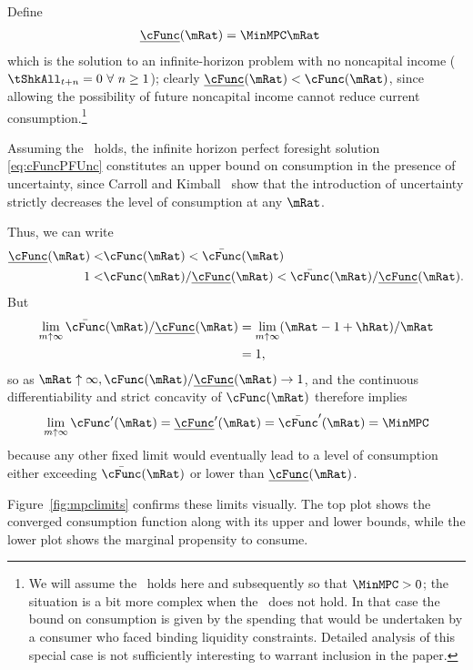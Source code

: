 \documentclass[BufferStockTheory]{subfiles}
\begin{document}
Define
\begin{align}
  \ushort{\cFunc}(\mRat)  & = \MinMPC \mRat \nonumber
\end{align}
which is the solution to an infinite-horizon problem with no noncapital
income
($\tShkAll_{t+n} = 0~\forall~n\geq1$); 
clearly $\ushort{\cFunc}(\mRat)
< \cFunc(\mRat)$, since allowing the possibility of future noncapital
income cannot reduce current consumption.\footnote{We will assume the
  \RIC~holds here and subsequently so that $\MinMPC > 0$; the situation
  is a bit more complex when the \RIC~does not hold.   In that case the bound on consumption is given by the spending
  that would be undertaken by a consumer who faced binding liquidity
  constraints.  Detailed analysis of this special case is not
  sufficiently interesting to warrant inclusion in the paper.}

Assuming the \FHWC~holds, the infinite horizon perfect
foresight solution \eqref{eq:cFuncPFUnc} constitutes an upper
bound on consumption in the presence of uncertainty, since Carroll and
Kimball~\citeyearpar{ckConcavity} show that the introduction of
uncertainty strictly decreases the level of consumption at any $\mRat$.

Thus, we can write
\begin{align}  
  \ushort{\cFunc}(\mRat) < & \cFunc(\mRat)  < \bar{\cFunc}(\mRat) \label{eq:lowerltupper} \\
  1 < & \cFunc(\mRat)/\ushort{\cFunc}(\mRat)  < \bar{\cFunc}(\mRat)/\ushort{\cFunc}(\mRat). \nonumber
\end{align}
But
\begin{align}  \label{eq:limitlowerupper}
  \lim_{m \uparrow \infty} \bar{\cFunc}(\mRat)/\ushort{\cFunc}(\mRat) 
  & = \lim_{m \uparrow \infty} (\mRat -1+ \hRat)/\mRat \nonumber \\
  & = 1, \nonumber
\end{align}
so as $\mRat \uparrow \infty, \cFunc(\mRat)/\ushort{\cFunc}(\mRat)
\rightarrow 1$, and the continuous differentiability and strict
concavity of $\cFunc(\mRat)$ therefore implies
\begin{equation}  \label{eq:limxtoinftycp}
  \lim_{m \uparrow \infty} \cFunc^{\prime}(\mRat) =
  \ushort{\cFunc}^{\prime}(\mRat) = \bar{\cFunc}^{\prime}(\mRat) = \MinMPC \notag
\end{equation}
because any other fixed limit would eventually lead to a level of
consumption either exceeding $\bar{\cFunc}(\mRat)$ or lower than
$\ushort{\cFunc}(\mRat)$.

Figure~\ref{fig:mpclimits} confirms these limits visually.  The top
plot shows the converged consumption function along with its upper and lower bounds,
while the lower plot shows the marginal propensity to consume.
\renewcommand{\figFile}{mpclimits}
\hypertarget{\figFile}{}

\end{document}
